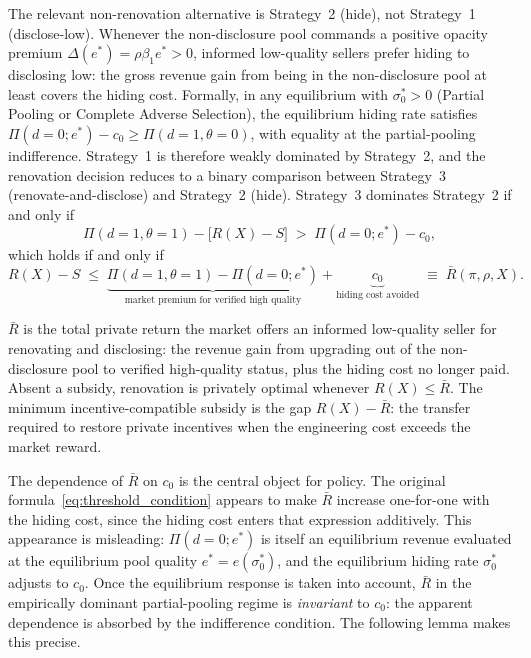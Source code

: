 \documentclass[10pt,letterpaper]{bp-template-concise}
\begin{document}
\noindent The relevant non-renovation alternative is Strategy~2 (hide), not Strategy~1 (disclose-low). Whenever the non-disclosure pool commands a positive opacity premium $\Delta(e^*) = \rho\beta_1 e^* > 0$, informed low-quality sellers prefer hiding to disclosing low: the gross revenue gain from being in the non-disclosure pool at least covers the hiding cost. Formally, in any equilibrium with $\sigma_0^* > 0$ (Partial Pooling or Complete Adverse Selection), the equilibrium hiding rate satisfies $\Pi(d=0;e^*) - c_0 \ge \Pi(d=1,\theta=0)$, with equality at the partial-pooling indifference. Strategy~1 is therefore weakly dominated by Strategy~2, and the renovation decision reduces to a binary comparison between Strategy~3 (renovate-and-disclose) and Strategy~2 (hide). Strategy~3 dominates Strategy~2 if and only if
\begin{equation}
    \Pi(d=1,\theta=1) - \bigl[R(X)-S\bigr]
    \;>\;
    \Pi(d=0;e^*) - c_0,
    \label{eq:threshold_condition}
\end{equation}
which holds if and only if
\[
    R(X) - S \;\leq\;
    \underbrace{\Pi(d=1,\theta=1)-\Pi(d=0;e^*)}_{\text{market premium for verified high quality}}
    +\underbrace{c_0}_{\text{hiding cost avoided}}
    \;\equiv\;
    \bar{R}(\pi,\rho,X).
\]

$\bar R$ is the total private return the market offers an informed low-quality seller for renovating and disclosing: the revenue gain from upgrading out of the non-disclosure pool to verified high-quality status, plus the hiding cost no longer paid. Absent a subsidy, renovation is privately optimal whenever $R(X) \le \bar R$. The minimum incentive-compatible subsidy is the gap $R(X) - \bar R$: the transfer required to restore private incentives when the engineering cost exceeds the market reward.

The dependence of $\bar R$ on $c_0$ is the central object for policy. The original formula~\eqref{eq:threshold_condition} appears to make $\bar R$ increase one-for-one with the hiding cost, since the hiding cost enters that expression additively. This appearance is misleading: $\Pi(d=0;e^*)$ is itself an equilibrium revenue evaluated at the equilibrium pool quality $e^* = e(\sigma_0^*)$, and the equilibrium hiding rate $\sigma_0^*$ adjusts to $c_0$. Once the equilibrium response is taken into account, $\bar R$ in the empirically dominant partial-pooling regime is \emph{invariant} to $c_0$: the apparent dependence is absorbed by the indifference condition. The following lemma makes this precise.
\end{document}
